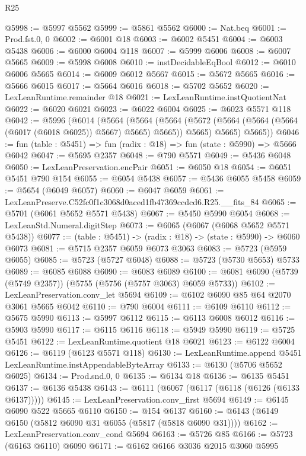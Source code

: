 \begin{lexlean}{R25}
\begin{coremodule}
@5998 := @5997 @5562
@5999 := @5861 @5562
@6000 := Nat.beq
@6001 := Prod.fst.{0, 0}
@6002 := @6001 @18
@6003 := @6002 @5451
@6004 := @6003 @5438
@6006 := @6000 @6004 @118
@6007 := @5999 @6006
@6008 := @6007 @5665
@6009 := @5998 @6008
@6010 := instDecidableEqBool
@6012 := @6010 @6006 @5665
@6014 := @6009 @6012 @5667
@6015 := @5672 @5665
@6016 := @5666 @6015
@6017 := @5664 @6016
@6018 := @5702 @5652
@6020 := LexLeanRuntime.remainder @18
@6021 := LexLeanRuntime.instQuotientNat
@6022 := @6020 @6021
@6023 := @6022 @6004
@6025 := @6023 @5571 @118
@6042 := @5996
    (@6014
      (@5664
        (@5664
          (@5664 (@5672 (@5664 (@5664 (@5664 (@6017 (@6018 @6025)) @5667) @5665) @5665)) @5665)
          @5665)
        @5665))
@6046 := fun (table : @5451) => fun (radix : @18) => fun (state : @5990) => @5666 @6042
@6047 := @5695 @2357
@6048 := @790 @5571
@6049 := @5436 @6048
@6050 := LexLeanPreservation.encPair
@6051 := @6050 @18
@6054 := @6051 @5451 @790 @154
@6055 := @6054 @5438
@6057 := @5436 @6055 @5458
@6059 := @5654 (@6049 @6057)
@6060 := @6047 @6059
@6061 := LexLeanPreserve.C52fc0f1c3068d0aced1fb47369ccdcd6.R25.__fits_84
@6065 := @5701 (@6061 @5652 @5571 @5438)
@6067 := @5450 @5990 @6054
@6068 := LexLeanStd.Numeral.digitStep
@6073 := @6065 (@6067 (@6068 @5652 @5571 @5438))
@6077 := (table : @5451) -> (radix : @18) -> (state : @5990) -> @6060 @6073
@6081 := @5715 @2357 @6059 @6073 @3063
@6083 := @5723 (@5959 @6055)
@6085 := @5723 (@5727 @6048)
@6088 := @5723 (@5730 @5653) @5733
@6089 := @6085 @6088
@6090 := @6083 @6089
@6100 := @6081 @6090 (@5739 (@5749 @2357)) (@5755 (@5756 (@5757 @3063) @6059 @5733))
@6102 := LexLeanPreservation.conv_let @5694
@6109 := @6102 @6090 @85 @64 @2070 @3061 @5665 @6042
@6110 := @790 @6004
@6111 := @6109 @6110
@6112 := @5675 @5990
@6113 := @5997 @6112
@6115 := @6113 @6008 @6012
@6116 := @5903 @5990
@6117 := @6115 @6116
@6118 := @5949 @5990
@6119 := @5725 @5451
@6122 := LexLeanRuntime.quotient @18 @6021
@6123 := @6122 @6004
@6126 := @6119 (@6123 @5571 @118)
@6130 := LexLeanRuntime.append @5451 LexLeanRuntime.instAppendableByteArray
@6133 := @6130 (@5706 @5652 @6025)
@6134 := Prod.snd.{0, 0}
@6135 := @6134 @18
@6136 := @6135 @5451
@6137 := @6136 @5438
@6143 := @6111 (@6067 (@6117 (@6118 (@6126 (@6133 @6137)))))
@6145 := LexLeanPreservation.conv_first @5694
@6149 := @6145 @6090 @522 @5665 @6110
@6150 := @154 @6137
@6160 := @6143 (@6149 @6150 (@5812 @6090 @31 @6055 (@5817 (@5818 @6090 @31))))
@6162 := LexLeanPreservation.conv_cond @5694
@6163 := @5726 @85
@6166 := @5723 (@6163 @6110) @6090
@6171 := @6162 @6166 @3036 @2015 @3060 @5995

\end{coremodule}
\end{lexlean}
